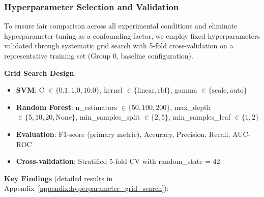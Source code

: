 

\subsubsection{Hyperparameter Selection and Validation}

To ensure fair comparison across all experimental conditions and eliminate hyperparameter tuning as a confounding factor, we employ fixed hyperparameters validated through systematic grid search with 5-fold cross-validation on a representative training set (Group 0, baseline configuration).

\textbf{Grid Search Design}:

\begin{itemize}
    \item \textbf{SVM}: C $\in \{0.1, 1.0, 10.0\}$, kernel $\in \{\text{linear}, \text{rbf}\}$, gamma $\in \{\text{scale}, \text{auto}\}$
    \item \textbf{Random Forest}: n\_estimators $\in \{50, 100, 200\}$, max\_depth $\in \{5, 10, 20, \text{None}\}$, min\_samples\_split $\in \{2, 5\}$, min\_samples\_leaf $\in \{1, 2\}$
    \item \textbf{Evaluation}: F1-score (primary metric), Accuracy, Precision, Recall, AUC-ROC
    \item \textbf{Cross-validation}: Stratified 5-fold CV with random\_state = 42
\end{itemize}

\textbf{Key Findings} (detailed results in Appendix~\ref{appendix:hyperparameter_grid_search}):

